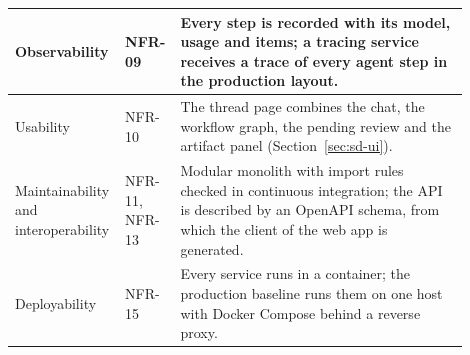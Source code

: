 \begin{longtable}{|p{0.17\linewidth}|p{0.11\linewidth}|p{0.62\linewidth}|}
    Observability & NFR-09 & Every step is recorded with its model, usage and items; a tracing service receives a trace of every agent step in the production layout. \\ \hline
    Usability & NFR-10 & The thread page combines the chat, the workflow graph, the pending review and the artifact panel (Section~\ref{sec:sd-ui}). \\ \hline
    Maintainability and interoperability & NFR-11, NFR-13 & Modular monolith with import rules checked in continuous integration; the API is described by an OpenAPI schema, from which the client of the web app is generated. \\ \hline
    Deployability & NFR-15 & Every service runs in a container; the production baseline runs them on one host with Docker Compose behind a reverse proxy. \\ \hline
\end{longtable}
\endgroup
